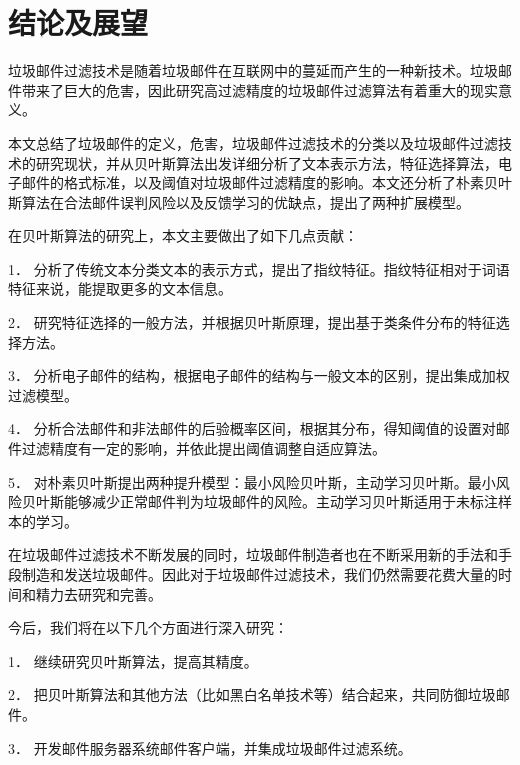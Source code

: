 \chapter{结论及展望}

垃圾邮件过滤技术是随着垃圾邮件在互联网中的蔓延而产生的一种新技术。垃圾邮件带来了巨大的危害，因此研究高过滤精度的垃圾邮件过滤算法有着重大的现实意义。

本文总结了垃圾邮件的定义，危害，垃圾邮件过滤技术的分类以及垃圾邮件过滤技术的研究现状，并从贝叶斯算法出发详细分析了文本表示方法，特征选择算法，电子邮件的格式标准，以及阈值对垃圾邮件过滤精度的影响。本文还分析了朴素贝叶斯算法在合法邮件误判风险以及反馈学习的优缺点，提出了两种扩展模型。

  在贝叶斯算法的研究上，本文主要做出了如下几点贡献：
  
1．	分析了传统文本分类文本的表示方式，提出了指纹特征。指纹特征相对于词语特征来说，能提取更多的文本信息。

2．	研究特征选择的一般方法，并根据贝叶斯原理，提出基于类条件分布的特征选择方法。

3．	分析电子邮件的结构，根据电子邮件的结构与一般文本的区别，提出集成加权过滤模型。

4．	分析合法邮件和非法邮件的后验概率区间，根据其分布，得知阈值的设置对邮件过滤精度有一定的影响，并依此提出阈值调整自适应算法。

5．	对朴素贝叶斯提出两种提升模型：最小风险贝叶斯，主动学习贝叶斯。最小风险贝叶斯能够减少正常邮件判为垃圾邮件的风险。主动学习贝叶斯适用于未标注样本的学习。

  在垃圾邮件过滤技术不断发展的同时，垃圾邮件制造者也在不断采用新的手法和手段制造和发送垃圾邮件。因此对于垃圾邮件过滤技术，我们仍然需要花费大量的时间和精力去研究和完善。
  
 今后，我们将在以下几个方面进行深入研究：
 
1．	 继续研究贝叶斯算法，提高其精度。

2．	把贝叶斯算法和其他方法（比如黑白名单技术等）结合起来，共同防御垃圾邮件。

3．	开发邮件服务器系统邮件客户端，并集成垃圾邮件过滤系统。
